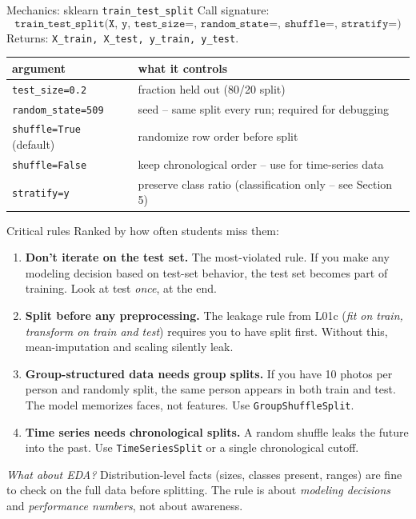 \documentclass[aspectratio=169]{beamer}
\begin{document}
\begin{frame}{Mechanics: sklearn \texttt{train\_test\_split}}
  Call signature:
  \[
    \texttt{train\_test\_split(X, y, test\_size=, random\_state=, shuffle=, stratify=)}
  \]
  Returns: \texttt{X\_train, X\_test, y\_train, y\_test}.
  \vfill
  \begin{center}\small
    \renewcommand{\arraystretch}{1.4}
    \begin{tabular}{l l}
      \textbf{argument} & \textbf{what it controls} \\
      \hline
      \texttt{test\_size=0.2} & fraction held out (80/20 split) \\
      \texttt{random\_state=509} & seed -- same split every run; required for debugging \\
      \texttt{shuffle=True} (default) & randomize row order before split \\
      \texttt{shuffle=False} & keep chronological order -- use for time-series data \\
      \texttt{stratify=y} & preserve class ratio (classification only -- see Section 5) \\
      \hline
    \end{tabular}
  \end{center}
\end{frame}

\begin{frame}{Critical rules}
  Ranked by how often students miss them:
  \begin{enumerate}
    \item \textbf{Don't iterate on the test set.} The most-violated rule. If you make any modeling decision based on test-set behavior, the test set becomes part of training. Look at test \emph{once}, at the end.
    \item \textbf{Split before any preprocessing.} The leakage rule from L01c (\emph{fit on train, transform on train and test}) requires you to have split first. Without this, mean-imputation and scaling silently leak.
    \item \textbf{Group-structured data needs group splits.} If you have 10 photos per person and randomly split, the same person appears in both train and test. The model memorizes faces, not features. Use \texttt{GroupShuffleSplit}.
    \item \textbf{Time series needs chronological splits.} A random shuffle leaks the future into the past. Use \texttt{TimeSeriesSplit} or a single chronological cutoff.
  \end{enumerate}
  \vfill
  \small\emph{What about EDA?} Distribution-level facts (sizes, classes present, ranges) are fine to check on the full data before splitting. The rule is about \emph{modeling decisions} and \emph{performance numbers}, not about awareness.
\end{frame}
\end{document}
